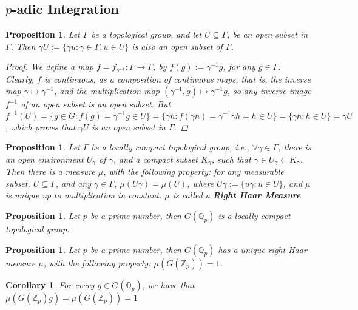\documentclass[12pt]{article}
\newtheorem{proposition}[theorem]{Proposition}
\newtheorem{corollary}[theorem]{Corollary}
\begin{document}
\subsection{$p$-adic Integration}
\begin{proposition}
\label{prop.topological.group.open.set}
Let $\Gamma$ be a topological group, and let $U\subseteq\Gamma$, be an open subset in $\Gamma$. Then $\gamma U:=\{\gamma u : \gamma\in\Gamma, u\in U\}$ is also an open subset of $\Gamma$.
\begin{proof}
We define a map $f=f_{\gamma^{-1}}:\Gamma\rightarrow\Gamma$, by $f(g):=\gamma^{-1}g$, for any $g\in\Gamma$. Clearly, $f$ is continuous, as a composition of continuous maps, that is, the inverse map $\gamma\mapsto\gamma^{-1}$, and the multiplication map $(\gamma^{-1},g)\mapsto\gamma^{-1}g$, so any inverse image $f^{-1}$ of an open subset is an open subset. But $f^{-1}(U)=\{g\in G : f(g)=\gamma^{-1}g\in U\}=\{\gamma h : f(\gamma h)=\gamma^{-1}\gamma h=h\in U\}=\{\gamma h : h\in U\}=\gamma U$, which proves that $\gamma U$ is an open subset in $\Gamma$.
\end{proof}
\end{proposition}
\begin{proposition}
\label{prop.compact.subset.right.haar.measure}
Let $\Gamma$ be a locally compact topological group, i.e., $\forall\gamma\in\Gamma$, there is an open environment $U_{\gamma}$ of $\gamma$, and a compact subset $K_{\gamma}$, such that $\gamma\in U_{\gamma}\subset K_{\gamma}$. Then there is a measure $\mu$, with the following property: for any measurable subset, $U\subseteq\Gamma$, and any $\gamma\in\Gamma$, $\mu(U\gamma)=\mu(U)$, where $U\gamma:=\{u\gamma : u\in U\}$, and $\mu$ is unique up to multiplication in constant. $\mu$ is called a \textbf{Right Haar Measure}
\end{proposition}
\begin{proposition}
\label{prop.padic.field.automorphisms.locally.compact.group}
Let $p$ be a prime number, then $G(\mathbb{Q}_p)$ is a locally compact topological group.
\end{proposition}
\begin{proposition}
\label{prop.padic.field.automorphisms.haar.measure}
Let $p$ be a prime number, then $G(\mathbb{Q}_p)$ has a unique right Haar measure $\mu$, with the following property: $\mu(G(\mathbb{Z}_p))=1$.
\end{proposition}
\begin{corollary}
\label{cor.haar.measure.padic.integers.cosets}
For every $g\in G(\mathbb{Q}_p)$, we have that $\mu(G(\mathbb{Z}_p)g)=\mu(G(\mathbb{Z}_p))=1$
\end{corollary}
\end{document}
